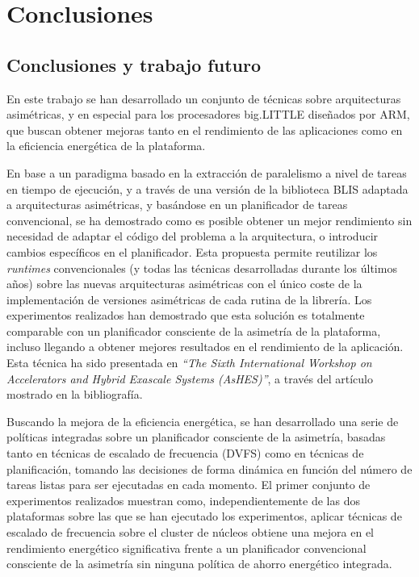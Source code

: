 \cleardoublepage

\chapter{Conclusiones}
\label{ch:chapter6}

\section{Conclusiones y trabajo futuro}

En este trabajo se han desarrollado un conjunto de técnicas sobre
arquitecturas asimétricas, y en especial para los procesadores big.LITTLE
diseñados por ARM, que buscan obtener mejoras tanto en el rendimiento de las
aplicaciones como en la eficiencia energética de la plataforma.

En base a un paradigma basado en la extracción de paralelismo a nivel de
tareas en tiempo de ejecución, y a través de una versión de la biblioteca
BLIS adaptada a arquitecturas asimétricas, y basándose en un planificador
de tareas convencional, se ha demostrado como es posible obtener un mejor
rendimiento sin necesidad de adaptar el código del problema a la
arquitectura, o introducir cambios específicos en el planificador. Esta
propuesta permite reutilizar los \emph{runtimes} convencionales (y todas
las técnicas desarrolladas durante los últimos años) sobre las nuevas
arquitecturas asimétricas con el único coste de la implementación de
versiones asimétricas de cada rutina de la librería.  Los experimentos
realizados han demostrado que esta solución es totalmente comparable con un
planificador consciente de la asimetría de la plataforma, incluso llegando
a obtener mejores resultados en el rendimiento de la aplicación. Esta
técnica ha sido presentada en \emph{``The Sixth International Workshop on
  Accelerators and Hybrid Exascale Systems (AsHES)''}, a través del
artículo~\cite{ashes} mostrado en la bibliografía.

Buscando la mejora de la eficiencia energética, se han desarrollado una
serie de políticas integradas sobre un planificador consciente de la
asimetría, basadas tanto en técnicas de escalado de frecuencia (DVFS) como
en técnicas de planificación, tomando las decisiones de forma dinámica en
función del número de tareas listas para ser ejecutadas en cada momento. El
primer conjunto de experimentos realizados muestran como,
independientemente de las dos plataformas sobre las que se han ejecutado
los experimentos, aplicar técnicas de escalado de frecuencia sobre el
cluster de núcleos \BIG obtiene una mejora en el rendimiento energético
significativa frente a un planificador convencional consciente de la
asimetría sin ninguna política de ahorro energético integrada.

